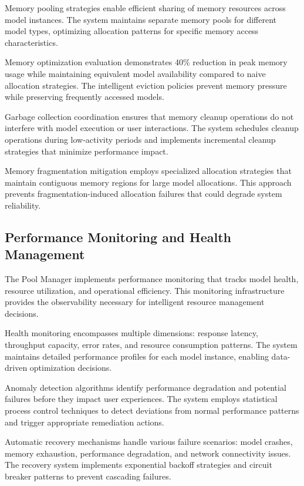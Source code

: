 Memory pooling strategies enable efficient sharing of memory resources across model instances. The system maintains separate memory pools for different model types, optimizing allocation patterns for specific memory access characteristics.

\begin{successbox}
Memory optimization evaluation demonstrates 40\% reduction in peak memory usage while maintaining equivalent model availability compared to naive allocation strategies. The intelligent eviction policies prevent memory pressure while preserving frequently accessed models.
\end{successbox}

Garbage collection coordination ensures that memory cleanup operations do not interfere with model execution or user interactions. The system schedules cleanup operations during low-activity periods and implements incremental cleanup strategies that minimize performance impact.

Memory fragmentation mitigation employs specialized allocation strategies that maintain contiguous memory regions for large model allocations. This approach prevents fragmentation-induced allocation failures that could degrade system reliability.

\subsection*{Performance Monitoring and Health Management}

The Pool Manager implements performance monitoring that tracks model health, resource utilization, and operational efficiency. This monitoring infrastructure provides the observability necessary for intelligent resource management decisions.

Health monitoring encompasses multiple dimensions: response latency, throughput capacity, error rates, and resource consumption patterns. The system maintains detailed performance profiles for each model instance, enabling data-driven optimization decisions.

Anomaly detection algorithms identify performance degradation and potential failures before they impact user experiences. The system employs statistical process control techniques to detect deviations from normal performance patterns and trigger appropriate remediation actions.

Automatic recovery mechanisms handle various failure scenarios: model crashes, memory exhaustion, performance degradation, and network connectivity issues. The recovery system implements exponential backoff strategies and circuit breaker patterns to prevent cascading failures.

